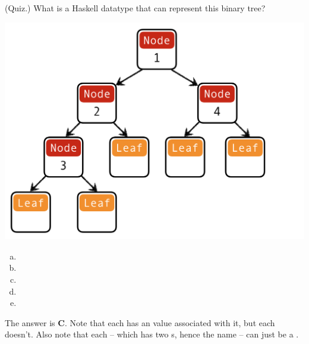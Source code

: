 \documentclass[letterpaper]{article}
\begin{document}
\begin{mdframed}[]
    (Quiz.) What is a Haskell datatype that can represent this binary tree?
    \begin{center}
        \includegraphics[scale=0.4]{../assets/tree-data-node.png}
    \end{center}

    \begin{enumerate}[(a)]
        \item {}
        \item {}
        \item {}
        \item {}
        \item {}
    \end{enumerate}

    \begin{mdframed}[]
        The answer is \textbf{C}. Note that each  has an  value associated with it, but each  doesn't. Also note that each  -- which has two s, hence the name -- can just be a .
    \end{mdframed}
\end{mdframed}
\end{document}
